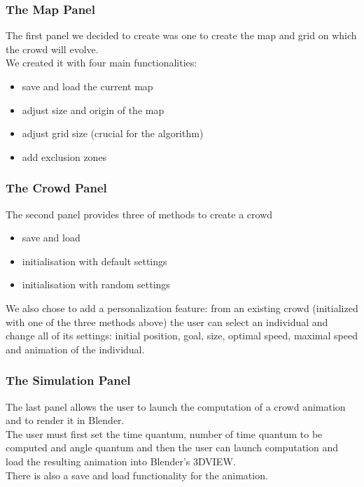 \subsubsection{The Map Panel}
The first panel we decided to create was one to create the map and grid on which the crowd will evolve.\\
We created it with four main functionalities:
\begin{itemize}
\item save and load the current map
\item adjust size and origin of the map
\item adjust grid size (crucial for the algorithm)
\item add exclusion zones
\end{itemize}


\subsubsection{The Crowd Panel}
The second panel provides three of methods to create a crowd 
\begin{itemize}
\item save and load
\item initialisation with default settings
\item initialisation with random settings
\end{itemize}

We also chose to add a personalization feature: from an existing crowd (initialized with one of the three methods above) the user can select an individual and change all of its settings: initial position, goal, size, optimal speed, maximal speed and animation of the individual.


\subsubsection{The Simulation Panel}
The last panel allows the user to launch the computation of a crowd animation and to render it in Blender.\\
The user must first set the time quantum, number of time quantum to be computed and angle quantum and then the user can launch computation and load the resulting animation into Blender's 3DVIEW.\\
There is also a save and load functionality for the animation.

